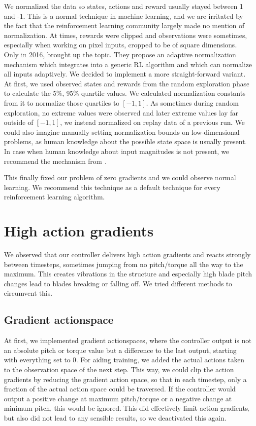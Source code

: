 \documentclass[hyperref,german,beleg]{cgvpub}
\begin{document}
We normalized the data so states, actions and reward usually stayed between 1 and -1. This is a normal technique in machine learning, and we are irritated by the fact that the reinforcement learning community largely made no mention of normalization. At times, rewards were clipped \cite{mnihPlayingAtariDeep2013} and observations were sometimes, especially when working on pixel inputs, cropped to be of square dimensions. Only in 2016, \cite{vanhasseltLearningValuesMany2016} brought up the topic. They propose an adaptive normalization mechanism which integrates into a generic \ac{RL} algorithm and which can normalize all inputs adaptively. We decided to implement a more straight-forward variant. At first, we used observed states and rewards from the random exploration phase to calculate the 5\%, 95\% quartile values. We calculated normalization constants from it to normalize those quartiles to $[-1, 1]$. As sometimes during random exploration, no extreme values were observed and later extreme values lay far outside of $[-1, 1]$, we instead normalized on replay data of a previous run. We could also imagine manually setting normalization bounds on low-dimensional problems, as human knowledge about the possible state space is usually present. In case when human knowledge about input magnitudes is not present, we recommend the mechanism from \cite{vanhasseltLearningValuesMany2016}.

This finally fixed our problem of zero gradients and we could observe normal learning. We recommend this technique as a default technique for every reinforcement learning algorithm. 

\section{High action gradients}

We observed that our controller delivers high action gradients and reacts strongly between timesteps, sometimes jumping from no pitch/torque all the way to the maximum. This creates vibrations in the structure and especially high blade pitch changes lead to blades breaking or falling off. We tried different methods to circumvent this.

\subsection{Gradient actionspace}

At first, we implemented gradient actionspaces, where the controller output is not an absolute pitch or torque value but a difference to the last output, starting with everything set to 0. For aiding training, we added the actual actions taken to the observation space of the next step. This way, we could clip the action gradients by reducing the gradient action space, so that in each timestep, only a fraction of the actual action space could be traversed. If the controller would output a positive change at maximum pitch/torque or a negative change at minimum pitch, this would be ignored. This did effectively limit action gradients, but also did not lead to any sensible results, so we deactivated this again.
\end{document}
